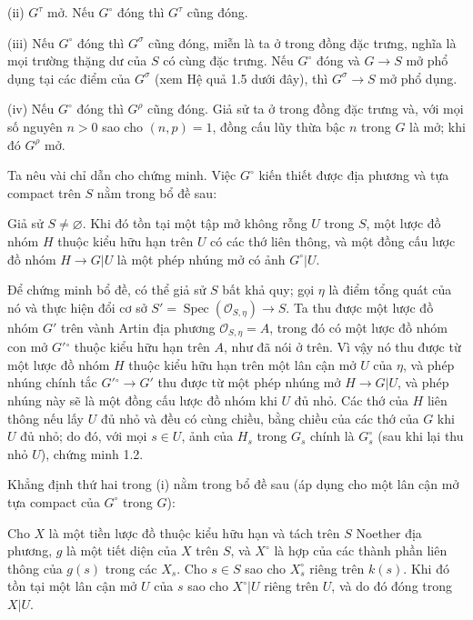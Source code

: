 \noindent (ii) $G^\tau$ mở. Nếu $G^\circ$ đóng thì $G^\tau$ cũng đóng.

\noindent (iii) Nếu $G^\circ$ đóng thì $G^\sigma$ cũng đóng, miễn là ta ở
trong đồng đặc trưng, nghĩa là mọi trường thặng dư của $S$ có cùng đặc trưng.
Nếu $G^\circ$ đóng và $G\longrightarrow S$ mở phổ dụng tại các điểm của
$G^\sigma$ (xem Hệ quả 1.5 dưới đây), thì
$G^\sigma\longrightarrow S$ mở phổ dụng.

\noindent (iv) Nếu $G^\circ$ đóng thì $G^\rho$ cũng đóng. Giả sử ta ở trong
đồng đặc trưng và, với mọi số nguyên $n>0$ sao cho $(n,p)=1$, đồng cấu lũy
thừa bậc $n$ trong $G$ là mở; khi đó $G^\rho$ mở.

Ta nêu vài chỉ dẫn cho chứng minh. Việc $G^\circ$ kiến thiết được địa phương
và tựa compact trên $S$ nằm trong bổ đề sau:

 Giả sử $S\neq\varnothing$. Khi đó tồn tại một tập mở
không rỗng $U$ trong $S$, một lược đồ nhóm $H$ thuộc kiểu hữu hạn trên $U$ có
các thớ liên thông, và một đồng cấu lược đồ nhóm
$H\longrightarrow G|U$ là một phép nhúng mở có ảnh $G^\circ|U$.

Để chứng minh bổ đề, có thể giả sử $S$ bất khả quy; gọi $\eta$ là điểm tổng
quát của nó và thực hiện đổi cơ sở
$S'=\operatorname{Spec}(\mathcal O_{S,\eta})\longrightarrow S$. Ta thu được
một lược đồ nhóm $G'$ trên vành Artin địa phương
$\mathcal O_{S,\eta}=A$, trong đó có một lược đồ nhóm con mở
$G'{}^\circ$ thuộc kiểu hữu hạn trên $A$, như đã nói ở trên. Vì vậy nó thu
được từ một lược đồ nhóm $H$ thuộc kiểu hữu hạn trên một lân cận mở $U$ của
$\eta$, và phép nhúng chính tắc $G'{}^\circ\longrightarrow G'$ thu được từ
một phép nhúng
mở $H\longrightarrow G|U$, và phép nhúng này sẽ là một đồng cấu lược đồ nhóm
khi $U$ đủ nhỏ. Các thớ của $H$ liên thông nếu lấy $U$ đủ nhỏ và đều có
cùng chiều, bằng chiều của các thớ của $G$ khi $U$ đủ nhỏ; do đó, với mọi
$s\in U$, ảnh của
$H_s$ trong $G_s$ chính là $G_s^\circ$ (sau khi lại thu nhỏ $U$), chứng minh
1.2.

Khẳng định thứ hai trong (i) nằm trong bổ đề sau (áp dụng cho một lân cận mở
tựa compact của $G^\circ$ trong $G$):

 Cho $X$ là một tiền lược đồ thuộc kiểu hữu hạn và tách
trên $S$ Noether địa phương, $g$ là một tiết diện của $X$ trên $S$, và
$X^\circ$ là hợp của các thành phần liên thông của $g(s)$ trong các $X_s$.
Cho $s\in S$ sao cho $X_s^\circ$ riêng trên $k(s)$. Khi đó tồn tại một lân
cận mở $U$ của $s$ sao cho $X^\circ|U$ riêng trên $U$, và do đó đóng trong
$X|U$.

